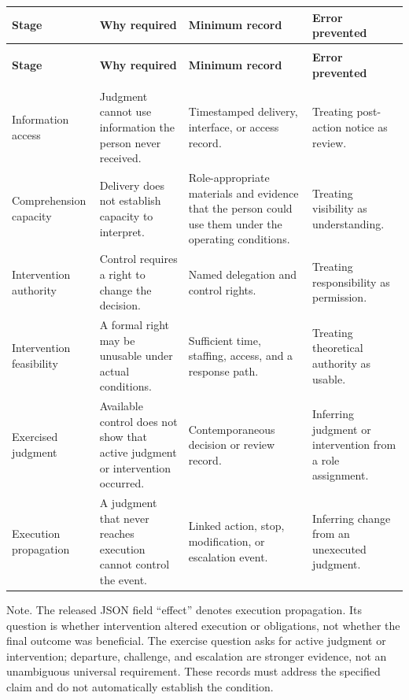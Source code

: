 \documentclass[11pt]{article}
\newlength{\TAETableWidth}
\begin{document}
\begin{longtable}{@{}>{\raggedright\arraybackslash}p{0.190\TAETableWidth}>{\raggedright\arraybackslash}p{0.270\TAETableWidth}>{\raggedright\arraybackslash}p{0.300\TAETableWidth}>{\raggedright\arraybackslash}p{0.240\TAETableWidth}@{}}
\toprule
\rowcolor{TAEPaleNavy}
\textcolor{TAENavy}{\textbf{Stage}} & \textcolor{TAENavy}{\textbf{Why required}} & \textcolor{TAENavy}{\textbf{Minimum record}} & \textcolor{TAENavy}{\textbf{Error prevented}} \\
\midrule
\endfirsthead
\multicolumn{4}{@{}l}{\footnotesize Table 1 (continued)}\\
\toprule
\rowcolor{TAEPaleNavy}
\textcolor{TAENavy}{\textbf{Stage}} & \textcolor{TAENavy}{\textbf{Why required}} & \textcolor{TAENavy}{\textbf{Minimum record}} & \textcolor{TAENavy}{\textbf{Error prevented}} \\
\midrule
\endhead
\midrule
\multicolumn{4}{r@{}}{\footnotesize Continued on next page}\\
\endfoot
\bottomrule
\endlastfoot
Information access & Judgment cannot use information the person never received. & Timestamped delivery, interface, or access record. & Treating post-action notice as review. \\
Comprehension capacity & Delivery does not establish capacity to interpret. & Role-appropriate materials and evidence that the person could use them under the operating conditions. & Treating visibility as understanding. \\
Intervention authority & Control requires a right to change the decision. & Named delegation and control rights. & Treating responsibility as permission. \\
Intervention feasibility & A formal right may be unusable under actual conditions. & Sufficient time, staffing, access, and a response path. & Treating theoretical authority as usable. \\
Exercised judgment & Available control does not show that active judgment or intervention occurred. & Contemporaneous decision or review record. & Inferring judgment or intervention from a role assignment. \\
Execution propagation & A judgment that never reaches execution cannot control the event. & Linked action, stop, modification, or escalation event. & Inferring change from an unexecuted judgment. \\
\end{longtable}
\endgroup
{\footnotesize\raggedright Note. The released JSON field “effect” denotes execution propagation. Its question is whether intervention altered execution or obligations, not whether the final outcome was beneficial. The exercise question asks for active judgment or intervention; departure, challenge, and escalation are stronger evidence, not an unambiguous universal requirement. These records must address the specified claim and do not automatically establish the condition.\par}
\medskip
\end{document}
